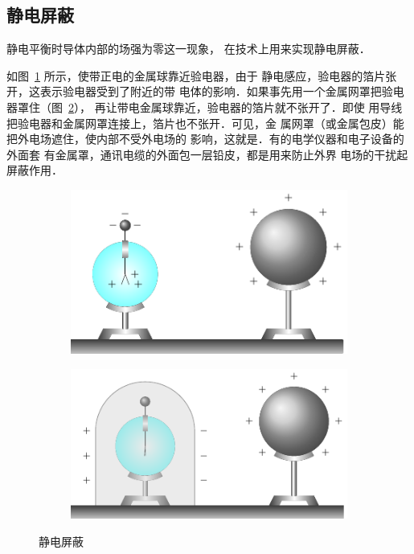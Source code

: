 \subsection{静电屏蔽}

静电平衡时导体内部的场强为零这一现象，
在技术上用来实现静电屏蔽．


如图~\ref{fig_B_6-15a} 所示，使带正电的金属球靠近验电器，由于
静电感应，验电器的箔片张开，这表示验电器受到了附近的带
电体的影响．如果事先用一个金属网罩把验电器罩住（图~\ref{fig_B_6-15b}），
再让带电金属球靠近，验电器的箔片就不张开了．即使
用导线把验电器和金属网罩连接上，箔片也不张开．可见，金
属网罩（或金属包皮）能把外电场遮住，使内部不受外电场的
影响，这就是．有的电学仪器和电子设备的外面套
有金属罩，通讯电缆的外面包一层铅皮，都是用来防止外界
电场的干扰起屏蔽作用．

\begin{figure}[htbp]
    \centering
    \begin{subfigure}{0.4\linewidth}
        \centering
        \includegraphics{fig/B/6-15a.pdf}
        \caption{}\label{fig_B_6-15a}
    \end{subfigure}
    \hfil
    \begin{subfigure}{0.4\linewidth}
        \centering
        \includegraphics{fig/B/6-15b.pdf}
        \caption{}\label{fig_B_6-15b}
    \end{subfigure}
    \caption{静电屏蔽}\label{fig_B_6-15}
\end{figure}


